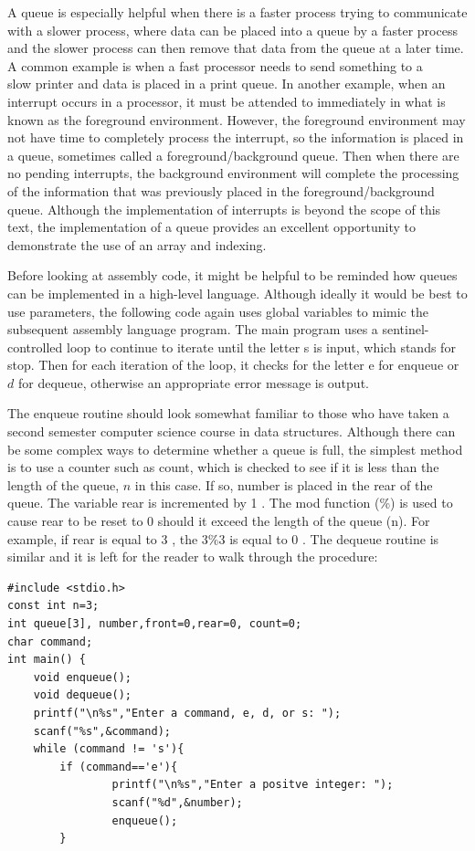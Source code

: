 \documentclass[10pt]{book}
\begin{document}
\begin{center}
\begin{center}
\begin{center}
A queue is especially helpful when there is a faster process trying to communicate with a slower process, where data can be placed into a queue by a faster process and the slower process can then remove that data from the queue at a later time. A common example is when a fast processor needs to send something to a\\
slow printer and data is placed in a print queue. In another example, when an interrupt occurs in a processor, it must be attended to immediately in what is known as the foreground environment. However, the foreground environment may not have time to completely process the interrupt, so the information is placed in a queue, sometimes called a foreground/background queue. Then when there are no pending interrupts, the background environment will complete the processing of the information that was previously placed in the foreground/background queue. Although the implementation of interrupts is beyond the scope of this text, the implementation of a queue provides an excellent opportunity to demonstrate the use of an array and indexing.


Before looking at assembly code, it might be helpful to be reminded how queues can be implemented in a high-level language. Although ideally it would be best to use parameters, the following code again uses global variables to mimic the subsequent assembly language program. The main program uses a sentinel-controlled loop to continue to iterate until the letter s is input, which stands for stop. Then for each iteration of the loop, it checks for the letter e for enqueue or $d$ for dequeue, otherwise an appropriate error message is output.

The enqueue routine should look somewhat familiar to those who have taken a second semester computer science course in data structures. Although there can be some complex ways to determine whether a queue is full, the simplest method is to use a counter such as count, which is checked to see if it is less than the length of the queue, $n$ in this case. If so, number is placed in the rear of the queue. The variable rear is incremented by 1 . The mod function (\%) is used to cause rear to be reset to 0 should it exceed the length of the queue (n). For example, if rear is equal to 3 , the $3 \% 3$ is equal to 0 . The dequeue routine is similar and it is left for the reader to walk through the procedure:

\begin{verbatim}
#include <stdio.h>
const int n=3;
int queue[3], number,front=0,rear=0, count=0;
char command;
int main() {
    void enqueue();
    void dequeue();
    printf("\n%s","Enter a command, e, d, or s: ");
    scanf("%s",&command);
    while (command != 's'){
        if (command=='e'){
                printf("\n%s","Enter a positve integer: ");
                scanf("%d",&number);
                enqueue();
        }
\end{verbatim}


\end{center}
\end{center}
\end{center}
\end{document}
